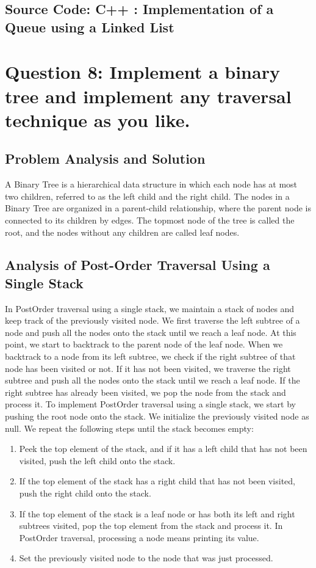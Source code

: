 \documentclass[a4paper]{article}
\begin{document}
\subsection{Source Code: C++ : Implementation of a Queue using a Linked List}


\pagebreak

\section{\hspace{-0.5em}\textbf{ Question 8}: Implement a binary tree and implement any traversal technique as you like.}

\subsection{Problem Analysis and Solution}
A Binary Tree is a hierarchical data structure in which each node has at most two children, referred to as the left child and the right child. The nodes in a Binary Tree are organized in a parent-child relationship, where the parent node is connected to its children by edges. The topmost node of the tree is called the root, and the nodes without any children are called leaf nodes.

\subsection{Analysis of Post-Order Traversal Using a Single Stack}
In PostOrder traversal using a single stack, we maintain a stack of nodes and keep track of the previously visited node. We first traverse the left subtree of a node and push all the nodes onto the stack until we reach a leaf node. At this point, we start to backtrack to the parent node of the leaf node.
When we backtrack to a node from its left subtree, we check if the right subtree of that node has been visited or not. If it has not been visited, we traverse the right subtree and push all the nodes onto the stack until we reach a leaf node. If the right subtree has already been visited, we pop the node from the stack and process it.
To implement PostOrder traversal using a single stack, we start by pushing the root node onto the stack. We initialize the previously visited node as null. We repeat the following steps until the stack becomes empty:
\begin{enumerate}
\item Peek the top element of the stack, and if it has a left child that has not been visited, push the left child onto the stack.
\item If the top element of the stack has a right child that has not been visited, push the right child onto the stack.
\item If the top element of the stack is a leaf node or has both its left and right subtrees visited, pop the top element from the stack and process it. In PostOrder traversal, processing a node means printing its value.
\item Set the previously visited node to the node that was just processed.
\end{enumerate}
\end{document}
